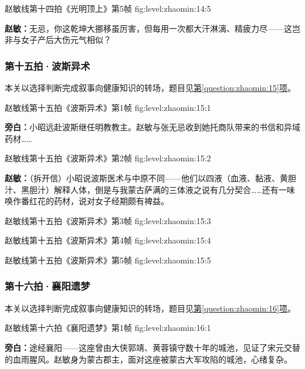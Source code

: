 \clearpage

  {赵敏线第十四拍《光明顶上》第5帧}
  {fig:level:zhaomin:14:5}
  {\scriptsize}
  {\textbf{赵敏：}无忌，你这乾坤大挪移虽厉害，但每用一次都大汗淋漓、精疲力尽——这岂非与女子产后大伤元气相似？\par}

\subsubsection{第十五拍·波斯异术}\label{plot:zhaomin:15}
本关以选择判断完成叙事向健康知识的转场，题目见\hyperref[question:zhaomin:15]{第\ref*{question:zhaomin:15}项}。

  {赵敏线第十五拍《波斯异术》第1帧}
  {fig:level:zhaomin:15:1}
  {\scriptsize}
  {\textbf{旁白：}小昭远赴波斯继任明教教主。赵敏与张无忌收到她托商队带来的书信和异域药材……\par}

  {赵敏线第十五拍《波斯异术》第2帧}
  {fig:level:zhaomin:15:2}
  {\scriptsize}
  {\textbf{赵敏：}（拆开信）小昭说波斯医术与中原不同——他们以四液（血液、黏液、黄胆汁、黑胆汁）解释人体，倒是与我蒙古萨满的三体液之说有几分契合……还有一味唤作番红花的药材，说对女子经期颇有裨益。\par}

\clearpage

  {赵敏线第十五拍《波斯异术》第3帧}
  {fig:level:zhaomin:15:3}
  {\scriptsize}
  {\mbox{}}

  {赵敏线第十五拍《波斯异术》第4帧}
  {fig:level:zhaomin:15:4}
  {\scriptsize}
  {\mbox{}}

  {赵敏线第十五拍《波斯异术》第5帧}
  {fig:level:zhaomin:15:5}
  {\scriptsize}
  {\mbox{}}

\clearpage

\subsubsection{第十六拍·襄阳遗梦}\label{plot:zhaomin:16}
本关以选择判断完成叙事向健康知识的转场，题目见\hyperref[question:zhaomin:16]{第\ref*{question:zhaomin:16}项}。

  {赵敏线第十六拍《襄阳遗梦》第1帧}
  {fig:level:zhaomin:16:1}
  {\scriptsize}
  {\textbf{旁白：}途经襄阳——这座曾由大侠郭靖、黄蓉镇守数十年的城池，见证了宋元交替的血雨腥风。赵敏身为蒙古郡主，面对这座被蒙古大军攻陷的城池，心绪复杂。\par}

